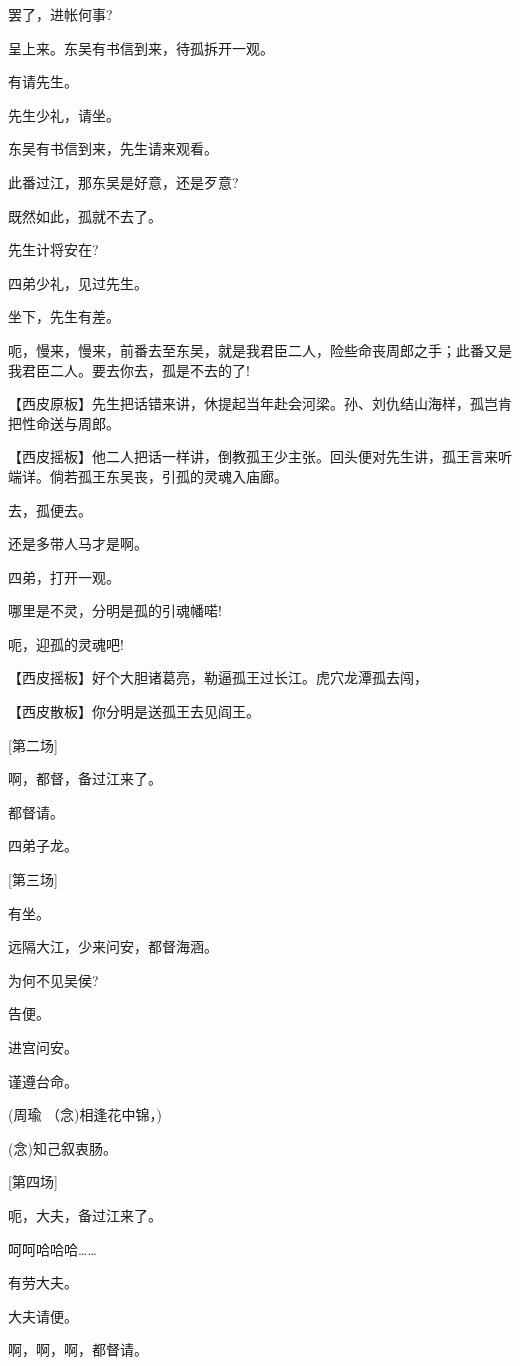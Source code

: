 罢了，进帐何事?

呈上来。东吴有书信到来，待孤拆开一观。

有请先生。

先生少礼，请坐。

东吴有书信到来，先生请来观看。

此番过江，那东吴是好意，还是歹意?

既然如此，孤就不去了。

先生计将安在?

四弟少礼，见过先生。

坐下，先生有差。

呃，慢来，慢来，前番去至东吴，就是我君臣二人，险些命丧周郎之手；此番又是我君臣二人。要去你去，孤是不去的了!

【西皮原板】先生把话错来讲，休提起当年赴会河梁。孙、刘仇结山海样，孤岂肯把性命送与周郎。

【西皮摇板】他二人把话一样讲，倒教孤王少主张。回头便对先生讲，孤王言来听端详。倘若孤王东吴丧，引孤的灵魂入庙廊。

去，孤便去。

还是多带人马才是啊。

四弟，打开一观。

哪里是不灵，分明是孤的引魂幡喏!

呃，迎孤的灵魂吧!

【西皮摇板】好个大胆诸葛亮，勒逼孤王过长江。虎穴龙潭孤去闯，

【西皮散板】你分明是送孤王去见阎王。

{[}第二场{]}

啊，都督，备过江来了。

都督请。

四弟子龙。

{[}第三场{]}

有坐。

远隔大江，少来问安，都督海涵。

为何不见吴侯?

告便。

进宫问安。

谨遵台命。

(周瑜 （念)相逢花中锦，)

(念)知己叙衷肠。

{[}第四场{]}

呃，大夫，备过江来了。

呵呵哈哈哈\ldots{}\ldots{}

有劳大夫。

大夫请便。

啊，啊，啊，都督请。

